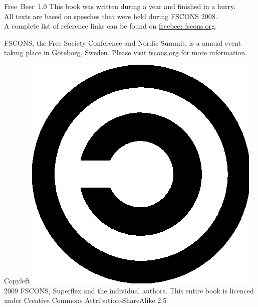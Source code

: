 \begin{flushleft}\hbox{\Large{Free Beer 1.0}}
\bigskip
This book was written during a year and finished in a hurry.\\
All texts are based on speeches that were held during FSCONS 2008.\\
A complete list of reference links can be found on \href{http://freebeer.fscons.org}{freebeer.fscons.org}.\\
\bigskip

FSCONS, the Free Society Conference and Nordic Summit, is a annual event taking place in Göteborg, Sweden. Please visit \href{http://fscons.org}{fscons.org} for more information.

\vfill
Copyleft \includegraphics[scale=0.055]{./media/Copyleft.eps} 2009 FSCONS, Superflex and the individual authors.
This entire book is licenced under Creative Commons Attribution-ShareAlike 2.5
\end{flushleft}
\newpage
